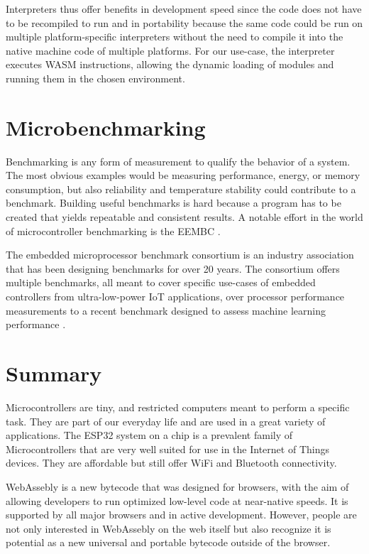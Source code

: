 Interpreters thus offer benefits in development speed since the code does not have to be recompiled to run and in portability because the same code could be run on multiple platform-specific interpreters without the need to compile it into the native machine code of multiple platforms. For our use-case, the interpreter executes WASM instructions, allowing the dynamic loading of modules and running them in the chosen environment.

\section{Microbenchmarking}

Benchmarking is any form of measurement to qualify the behavior of a system. The most obvious examples would be measuring performance, energy, or memory consumption, but also reliability and temperature stability could contribute to a benchmark. Building useful benchmarks is hard because a program has to be created that yields repeatable and consistent results. A notable effort in the world of microcontroller benchmarking is the EEMBC \autocite{noauthor_embedded_nodate}.

The embedded microprocessor benchmark consortium is an industry association that has been designing benchmarks for over 20 years. The consortium offers multiple benchmarks, all meant to cover specific use-cases of embedded controllers from ultra-low-power IoT applications, over processor performance measurements to a recent benchmark designed to assess machine learning performance \autocite{noauthor_benchmark_nodate}.

\section{Summary}
Microcontrollers are tiny, and restricted computers meant to perform a specific task. They are part of our everyday life and are used in a great variety of applications. The ESP32 system on a chip is a prevalent family of Microcontrollers that are very well suited for use in the Internet of Things devices. They are affordable but still offer WiFi and Bluetooth connectivity.

WebAssebly is a new bytecode that was designed for browsers, with the aim of allowing developers to run optimized low-level code at near-native speeds. It is supported by all major browsers and in active development. However, people are not only interested in WebAssebly on the web itself but also recognize it is potential as a new universal and portable bytecode outside of the browser.